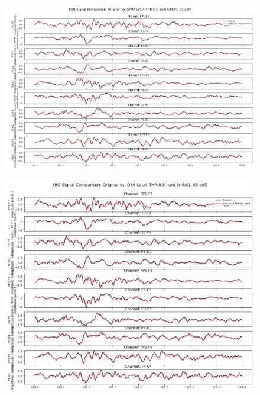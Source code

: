 \documentclass{article}
\begin{document}
			\begin{figure}[H]
			    \centering
			    \includegraphics[width=1.2\textwidth]{wav1.png}
			    \caption{}
			    \label{}
			\end{figure}


			\begin{figure}[H]
			    \centering
			    \includegraphics[width=1.2\textwidth]{wav2.png}
			    \caption{}
			    \label{}
			\end{figure}
\end{document}
